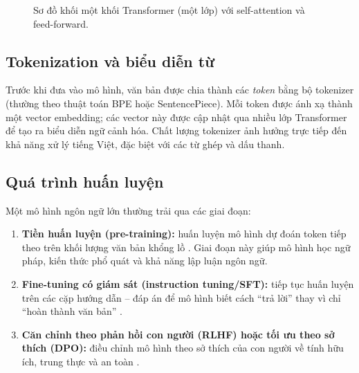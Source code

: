 \begin{figure}[htbp]
\centering
{}
\caption{Sơ đồ khối một khối Transformer (một lớp) với self-attention và feed-forward.}
\label{fig:transformer}
\end{figure}

\subsection{Tokenization và biểu diễn từ}

Trước khi đưa vào mô hình, văn bản được chia thành các \emph{token} bằng bộ tokenizer
(thường theo thuật toán BPE \cite{sennrich2016bpe} hoặc SentencePiece). Mỗi token được ánh
xạ thành một vector
embedding; các vector này được cập nhật qua nhiều lớp Transformer để tạo ra biểu diễn ngữ cảnh
hóa. Chất lượng tokenizer ảnh hưởng trực tiếp đến khả năng xử lý tiếng Việt, đặc biệt với
các từ ghép và dấu thanh.

\subsection{Quá trình huấn luyện}

Một mô hình ngôn ngữ lớn thường trải qua các giai đoạn:

\begin{enumerate}
  \item \textbf{Tiền huấn luyện (pre-training):} huấn luyện mô hình dự đoán token tiếp theo
  trên khối lượng văn bản khổng lồ \cite{zhao2023survey}. Giai đoạn này giúp mô hình học
  ngữ pháp, kiến thức phổ
  quát và khả năng lập luận ngôn ngữ.
  \item \textbf{Fine-tuning có giám sát (instruction tuning/SFT):} tiếp tục huấn luyện trên
  các cặp hướng dẫn -- đáp án để mô hình biết cách ``trả lời'' thay vì chỉ ``hoàn thành
  văn bản'' \cite{chung2022instruction}.
  \item \textbf{Căn chỉnh theo phản hồi con người (RLHF) hoặc tối ưu theo sở thích (DPO):}
  điều chỉnh mô hình theo sở thích của con người về tính hữu ích, trung thực và an toàn
  \cite{ouyang2022instructgpt,rafailov2023dpo}.
\end{enumerate}

